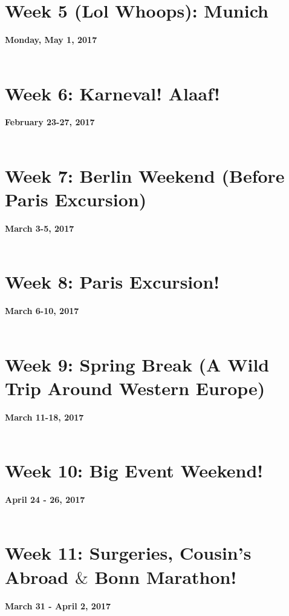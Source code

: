 \documentclass[oneside, 12pt]{book}
\begin{document}
\chapter{Week 5 (Lol Whoops): Munich}
\textbf{Monday, May 1, 2017}\\\\


\chapter{Week 6: Karneval! Alaaf!}
\textbf{February 23-27, 2017}\\\\


\chapter{Week 7: Berlin Weekend (Before Paris Excursion)}
\textbf{March 3-5, 2017}\\\\


\chapter{Week 8: Paris Excursion!}
\textbf{March 6-10, 2017}\\\\


\chapter[Week 9: Spring Break]{Week 9: Spring Break (A Wild Trip Around Western Europe)}
\textbf{March 11-18, 2017}\\\\


\chapter{Week 10: Big Event Weekend!}
\textbf{April 24 - 26, 2017}\\\\


\chapter{Week 11: Surgeries, Cousin's Abroad $\&$ Bonn Marathon!}
\textbf{March 31 - April 2, 2017}\\\\

\end{document}
